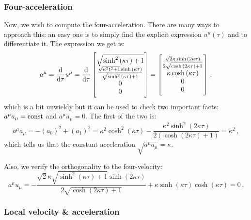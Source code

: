 \documentclass[main.tex]{subfiles}
\begin{document}
\subsubsection{Four-acceleration}

Now, we wish to compute the four-acceleration. There are many ways to approach this: an easy one is to simply find the explicit expression \(u^{\mu } (\tau )\) and to differentiate it. The expression we get is:
%
\begin{equation}
    a^{\mu } = \dv{}{\tau } u^{\mu } = \dv{}{\tau }   
  \begin{bmatrix}
    \sqrt{\sinh^{2}{\left(\kappa \tau \right)} + 1}
        \\
    \frac{\sqrt{\kappa^{2} t^{2} + 1} \sinh{\left(\kappa \tau \right)}}{\sqrt{\sinh^{2}{\left(\kappa \tau \right)} + 1}} \\
    0 \\
    0
  \end{bmatrix}
  =
  \begin{bmatrix}
    \frac{\sqrt{2} \kappa \sinh{\left(2 \kappa \tau \right)}}{2 \sqrt{\cosh{\left(2 \kappa \tau \right)} + 1}}
    \\
    \kappa \cosh \left(\kappa \tau \right)\\
    0 \\
    0
  \end{bmatrix}
\,,
\end{equation}
%
which is a bit unwieldy but it can be used to check two important facts: \(a^{\mu } a_{\mu } = \text{const} \) and \(a^{\mu }u_{\mu } = 0\). The first of the two is:
%
\begin{equation}
    a^{\mu }a_{\mu } = -(a_0 )^2 + (a_1 )^2 =
    \kappa^{2} \cosh^{2}{\left(\kappa \tau \right)} - \frac{\kappa^{2} \sinh^{2}{\left(2 \kappa \tau \right)}}{2 \left(\cosh{\left(2 \kappa \tau \right)} + 1\right)}
    = \kappa^2 
\,,
\end{equation}
%
which tells us that the constant acceleration \(\sqrt{a^{\mu }a_{\mu }} = \kappa \).

Also, we verify the orthogonality to the four-velocity: 
%
\begin{equation}
  a^{\mu }u_{\mu } = 
  - \frac{\sqrt{2} \kappa \sqrt{\sinh^{2}{\left(\kappa \tau \right)} + 1} \sinh{\left(2 \kappa \tau \right)}}{2 \sqrt{\cosh{\left(2 \kappa \tau \right)} + 1}} + \kappa \sinh{\left(\kappa \tau \right)} \cosh{\left(\kappa \tau \right)}
  = 0
\,.
\end{equation}

\subsubsection{Local velocity \& acceleration}
\end{document}
